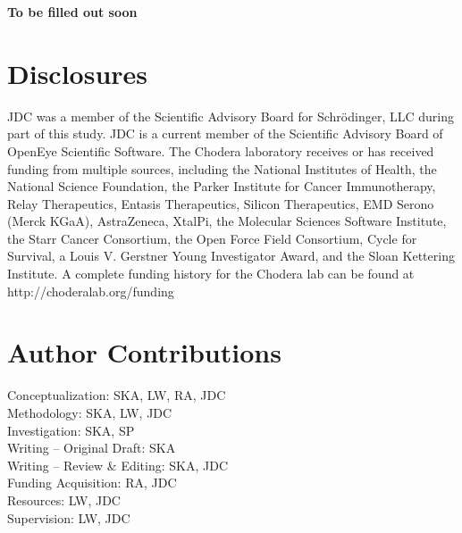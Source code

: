 \documentclass[9pt,lineno]{elife-modified} %
\begin{document}
\textbf{To be filled out soon}


\section{Disclosures}

JDC was a member of the Scientific Advisory Board for Schrödinger, LLC during part of this study.
JDC is a current member of the Scientific Advisory Board of OpenEye Scientific Software.
The Chodera laboratory receives or has received funding from multiple sources, including the National Institutes of Health, the National Science Foundation, the Parker Institute for Cancer Immunotherapy, Relay Therapeutics, Entasis Therapeutics, Silicon Therapeutics, EMD Serono (Merck KGaA), AstraZeneca, XtalPi, the Molecular Sciences Software Institute, the Starr Cancer Consortium, the Open Force Field Consortium, Cycle for Survival, a Louis V. Gerstner Young Investigator Award, and the Sloan Kettering Institute.
A complete funding history for the Chodera lab can be found at http://choderalab.org/funding


\section{Author Contributions}
Conceptualization: SKA, LW, RA, JDC \\
Methodology: SKA, LW, JDC\\
Investigation: SKA, SP\\
Writing -- Original Draft: SKA\\
Writing -- Review \& Editing: SKA, JDC \\
Funding Acquisition: RA, JDC\\
Resources: LW, JDC\\
Supervision: LW, JDC


%
\newpage
%






%
%
%
\end{document}
